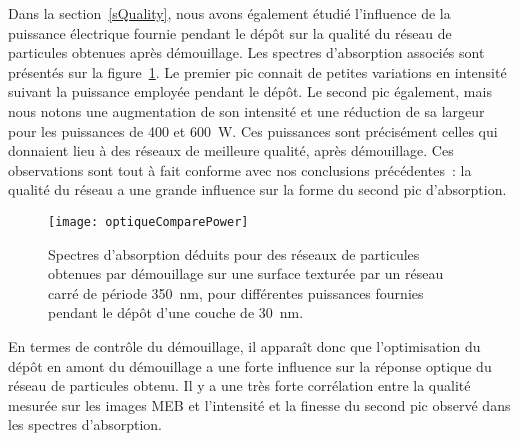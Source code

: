 Dans la section~\ref{sQuality}, nous avons également étudié l'influence de la puissance électrique fournie pendant le dépôt sur la qualité du réseau de particules obtenues après démouillage. Les spectres d'absorption associés sont présentés sur la figure~\ref{optiqueComparePower}. Le premier pic connait de petites variations en intensité suivant la puissance employée pendant le dépôt. Le second pic également, mais nous notons une augmentation de son intensité et une réduction de sa largeur pour les puissances de 400 et 600~W. Ces puissances sont précisément celles qui donnaient lieu à des réseaux de meilleure qualité, après démouillage. Ces observations sont tout à fait conforme avec nos conclusions précédentes~: la qualité du réseau a une grande influence sur la forme du second pic d'absorption.\par  
\begin{figure}[!htb]
\centering
\texttt{[image: optiqueComparePower]}
\caption{Spectres d’absorption déduits pour des réseaux de particules obtenues par démouillage sur une surface texturée par un réseau carré de période 350~nm, pour différentes puissances fournies pendant le dépôt d'une couche de 30~nm.}
\label{optiqueComparePower}
\end{figure}
En termes de contrôle du démouillage, il apparaît donc que l'optimisation du dépôt en amont du démouillage a une forte influence sur la réponse optique du réseau de particules obtenu. Il y a une très forte corrélation entre la qualité mesurée sur les images MEB et l'intensité et la finesse du second pic observé dans les spectres d'absorption.\par 

